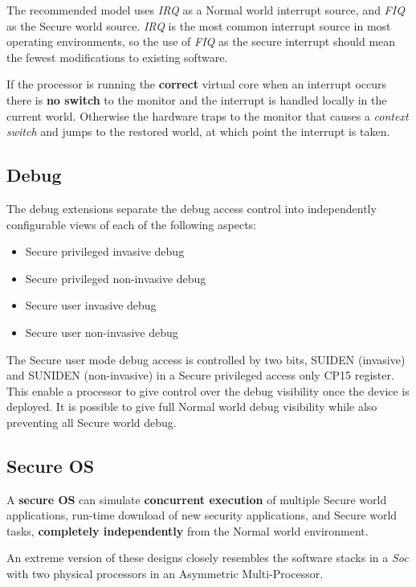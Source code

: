 The recommended model uses \textit{IRQ} as a Normal world interrupt source, and \textit{FIQ} as the Secure world source.
\textit{IRQ} is the most common interrupt source in most operating environments,
so the use of \textit{FIQ} as the secure interrupt
should mean the fewest modifications to existing software.

If the processor is running the \textbf{correct} virtual core when an interrupt occurs there is \textbf{no switch} to the monitor and the interrupt is handled locally in the current world.
Otherwise the hardware traps to the monitor that causes a \textit{context switch} and jumps to the restored world, at which point the interrupt is taken.

\subsection{Debug}
The debug extensions separate the debug access control into independently
configurable views of each of the following aspects:

\begin{itemize}
   \item Secure privileged invasive debug
   \item Secure privileged non-invasive debug
   \item Secure user invasive debug
   \item Secure user non-invasive debug
\end{itemize}

The Secure user mode debug access is controlled by two bits, SUIDEN (invasive)
and SUNIDEN (non-invasive) in a Secure privileged access only CP15 register.
This enable a processor to give control over the debug visibility once the device is deployed.
It is possible to give full Normal world debug visibility while also preventing all Secure world debug.

\subsection{Secure OS}

A \textbf{secure OS} can simulate \textbf{concurrent execution} of multiple Secure world applications,
run-time download of new security applications, and Secure world
tasks, \textbf{completely independently} from the Normal world environment.

An extreme version of these designs closely resembles the software stacks in a \textit{Soc} with two physical processors in an Asymmetric Multi-Processor.

